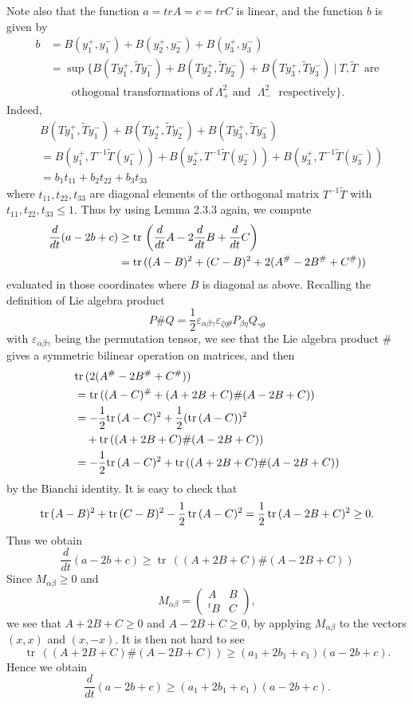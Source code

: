 Note also that the function $a=trA=c=trC$ is linear, and the
function $b$ is given by
\begin{align*}
b&  = B(y_1^+,y_1^-)+B(y_2^+,y_2^-)+B(y_3^+,y_3^-) \\
& =\sup\Big\{B(Ty_1^+,\tilde{T}y_1^-)+B(Ty_2^+,\tilde{T}y_2^-)
+B(Ty_3^+,\tilde{T}y_3^-)\ |
\ T,\tilde{T} \; \text{ are} \\
&\qquad \text{othogonal transformations of}\ \Lambda^2_+ \; \text{
and }\; \Lambda^2_-\; \text{ respectively}\Big\}.
\end{align*}
Indeed,
\begin{align*}
& B(Ty_1^+,\tilde{T}y_1^-)+B(Ty_2^+,\tilde{T}y_2^-)
+B(Ty_3^+,\tilde{T}y_3^-)\\
&  = B(y_1^+,T^{-1}\tilde{T}(y_1^-))
+B(y_2^+,T^{-1}\tilde{T}(y_2^-))+B(y_3^+,T^{-1}\tilde{T}(y_3^-))\\
&  = b_1t_{11}+b_2t_{22}+b_3t_{33}
\end{align*}
where $t_{11},t_{22},t_{33}$ are diagonal elements of the
orthogonal matrix $T^{-1}\tilde{T}$ with $t_{11},t_{22},t_{33}\leq
1$. Thus by using Lemma 2.3.3 again, we compute
\begin{align*}
\frac{d}{dt}(a-2b+c)&  \geq
{\rm tr}\,\left(\frac{d}{dt}A-2\frac{d}{dt}B+\frac{d}{dt}C\right)\\
&  ={\rm tr}\,((A-B)^2+(C-B)^2+2(A^\#-2B^\#+C^\#))
\end{align*}
evaluated in those coordinates where $B$ is diagonal as above.
Recalling the definition of Lie algebra product
$$
P\#Q=\frac{1}{2}\varepsilon_{\alpha\beta\gamma}
\varepsilon_{\zeta\eta\theta}P_{\beta\eta}Q_{\gamma\theta}
$$
with $\varepsilon_{\alpha\beta\gamma}$ being the permutation
tensor, we see that the Lie algebra product $\#$ gives a symmetric
bilinear operation on matrices, and then
\begin{align*}
& {\rm tr}\,(2(A^\#-2B^\#+C^\#)) \\
&  = {\rm tr}\,((A-C)^\#+(A+2B+C)\#(A-2B+C))\\
&  = -\frac{1}{2}{\rm tr}\,(A-C)^2+\frac{1}{2}({\rm tr}\,(A-C))^2\\
&\quad + {\rm tr}\,((A+2B+C)\#(A-2B+C))\\
&  = -\frac{1}{2}{\rm tr}\,(A-C)^2+{\rm tr}\,((A+2B+C)\#(A-2B+C))
\end{align*}
by the Bianchi identity. It is easy to check that
$$
{\rm tr}\,(A-B)^2+\operatorname{tr}\,(C-B)^2-\frac{1}{2}\operatorname{tr}\,(A-C)^2
=\frac{1}{2}\operatorname{tr}\,(A-2B+C)^2\geq 0.
$$
Thus we obtain
$$
\frac{d}{dt}(a-2b+c)\geq \operatorname{tr}\,((A+2B+C)\#(A-2B+C))
$$
Since $M_{\alpha\beta}\geq 0$ and
$$
M_{\alpha\beta}= { \left(
  \begin{array}{cc}
    A &   B\\[4mm]
    ^tB &   C
   \end{array}
\right),}
$$
we see that $A+2B+C\geq 0$ and $A-2B+C\geq 0$, by applying
$M_{\alpha\beta}$ to the vectors $(x,x)$ and $(x,-x)$. It is then
not hard to see
$$
\operatorname{tr}\,((A+2B+C)\#(A-2B+C))\geq (a_1+2b_1+c_1)(a-2b+c).
$$
Hence we obtain \begin{equation}
\frac{d}{dt}(a-2b+c)\geq (a_1+2b_1+c_1)(a-2b+c). %
\end{equation}

